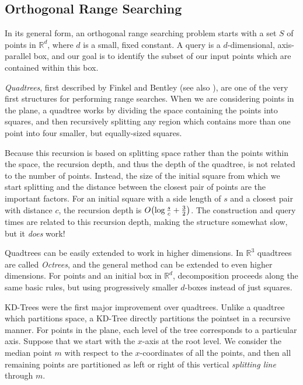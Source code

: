 \subsection*{Orthogonal Range Searching} 

In its general form, an orthogonal range searching problem starts with a set $S$ of points in $\mathbb{R}^d$, where $d$ is a small, fixed constant.
A query is a $d$-dimensional, axis-parallel box, and our goal is to identify the subset of our input points which are contained within this box.

\emph{Quadtrees}, first described by Finkel and Bentley\cite{Finkel74} (see also \cite[Chapter~14]{deberg}), are one of the very first structures for performing range searches.
When we are considering points in the plane, a quadtree works by dividing the space containing the points into squares, and then recursively splitting any region which contains more than one point into four smaller, but equally-sized squares.

Because this recursion is based on splitting space rather than the points within the space, the recursion depth, and thus the depth of the quadtree, is not related to the number of points. 
Instead, the size of the initial square from which we start splitting and the distance between the closest pair of points are the important factors.
For an initial square with a side length of $s$ and a closest pair with distance $c$, the recursion depth is $O\!\left(\log{\frac{s}{c}} + \frac{3}{2}\right)$.
The construction and query times are related to this recursion depth, making the structure somewhat slow, but it \emph{does} work!

Quadtrees can be easily extended to work in higher dimensions. 
In $\mathbb{R}^3$ quadtrees are called \emph{Octrees}, and the general method can be extended to even higher dimensions. 
For points and an initial box in $\mathbb{R}^d$, decomposition proceeds along the same basic rules, but using progressively smaller $d$-boxes instead of just squares.


KD-Trees\cite{Bentley75} were the first major improvement over quadtrees.
Unlike a quadtree which partitions space, a KD-Tree directly partitions the pointset in a recursive manner.
For points in the plane, each level of the tree corresponds to a particular axis.
Suppose that we start with the $x$-axis at the root level.
We consider the median point $m$ with respect to the $x$-coordinates of all the points, and then all remaining points are partitioned as left or right of this vertical \emph{splitting line} through $m$.

